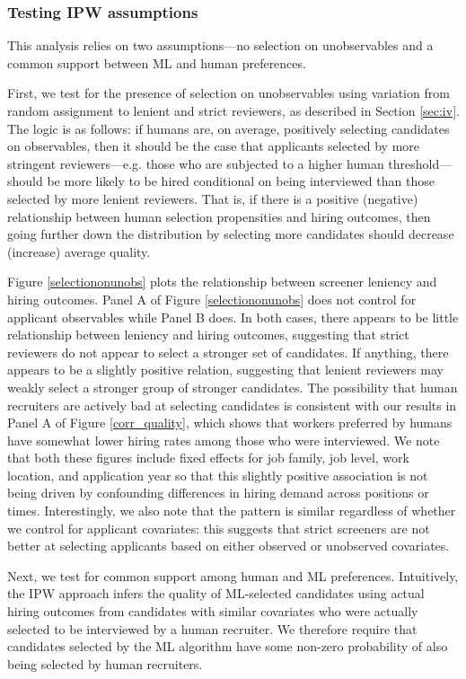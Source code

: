 \documentclass[crop,noquery,editorname,historyrev,nosurname,runningno,sepcount]{RESTUD}
\begin{document}
\subsubsection{Testing IPW assumptions} This analysis relies on two assumptions---no selection on unobservables and a common support between ML and human preferences.

First, we test for the presence of selection on unobservables using variation from random assignment to lenient and strict reviewers, as described in Section \ref{sec:iv}.  The logic is as follows: if humans are, on average, positively selecting candidates on observables, then it should be the case that applicants selected by more stringent reviewers---e.g. those who are subjected to a higher human threshold---should be more likely to be hired conditional on being interviewed than those selected by more lenient reviewers. That is, if there is a positive (negative) relationship between human selection propensities and hiring outcomes, then going further down the distribution by selecting more candidates should decrease (increase) average quality. 

Figure \ref{selectiononunobs} plots the relationship between screener leniency and hiring outcomes.  Panel A of Figure \ref{selectiononunobs} does not control for applicant observables while Panel B does.  In both cases, there appears to be little relationship between leniency and hiring outcomes, suggesting that strict reviewers do not appear to select a stronger set of candidates.  If anything, there appears to be a slightly positive relation, suggesting that lenient reviewers may weakly select a stronger group of stronger candidates.  The possibility that human recruiters are actively bad at selecting candidates is consistent with our results in Panel A of Figure \ref{corr_quality}, which shows that workers preferred by humans have somewhat lower hiring rates among those who were interviewed.  We note that both these figures include fixed effects for job family, job level, work location, and application year so that this slightly positive association is not being driven by confounding differences in hiring demand across positions or times.
Interestingly, we also note that the pattern is similar regardless of whether we control for applicant covariates: this suggests that strict screeners are not better at selecting applicants based on either observed or unobserved covariates.

Next, we test for common support among human and ML preferences.  Intuitively, the IPW approach infers the quality of ML-selected candidates using actual hiring outcomes from candidates with similar covariates who were actually selected to be interviewed by a human recruiter.  We therefore require that candidates selected by the ML algorithm have some non-zero probability of also being selected by human recruiters.  
\end{document}
